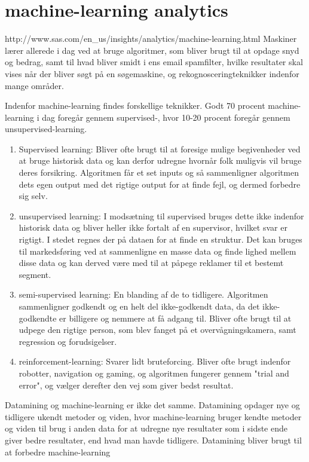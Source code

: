 \documentclass[12pt,hidelinks]{article}
\begin{document}
	\section{machine-learning analytics}
	http://www.sas.com/en\_us/insights/analytics/machine-learning.html
	Maskiner lærer allerede i dag ved at bruge algoritmer, som bliver brugt til at opdage snyd og bedrag, samt til hvad bliver smidt i ens email spamfilter, hvilke resultater skal vises når der bliver søgt på en søgemaskine, og rekognosceringteknikker indenfor mange områder.
	
	Indenfor machine-learning findes forskellige teknikker.
	Godt 70 procent machine-learning i dag foregår gennem supervised-, hvor 10-20 procent foregår gennem unsupervised-learning.
	\begin{enumerate}
		\item Supervised learning: 	Bliver ofte brugt til at foresige mulige begivenheder ved at bruge historisk data og kan derfor udregne hvornår folk muligvis vil bruge deres forsikring. Algoritmen får et set inputs og så sammenligner algoritmen dets egen output med det rigtige output for at finde fejl, og dermed forbedre sig selv.
		\item unsupervised learning: I modsætning til supervised bruges dette ikke indenfor historisk data og bliver heller ikke fortalt af en supervisor, hvilket svar er rigtigt. I stedet regnes der på dataen for at finde en struktur. Det kan bruges til markedsføring ved at sammenligne en masse data og finde lighed mellem disse data og kan derved være med til at påpege reklamer til et bestemt segment.
		\item semi-supervised learning: En blanding af de to tidligere. Algoritmen sammenligner godkendt og en helt del ikke-godkendt data, da det ikke-godkendte er billigere og nemmere at få adgang til. Bliver ofte brugt til at udpege den rigtige person, som blev fanget på et overvågningskamera, samt regression og forudsigelser.
		\item reinforcement-learning: Svarer lidt bruteforcing. Bliver ofte brugt indenfor robotter, navigation og gaming, og algoritmen fungerer gennem "trial and error", og vælger derefter den vej som giver bedst resultat.
	\end{enumerate}
	Datamining og machine-learning er ikke det samme. Datamining opdager nye og tidligere ukendt metoder og viden, hvor machine-learning bruger kendte metoder og viden til brug i anden data for at udregne nye resultater som i sidste ende giver bedre resultater, end hvad man havde tidligere. Datamining bliver brugt til at forbedre machine-learning
\end{document}
